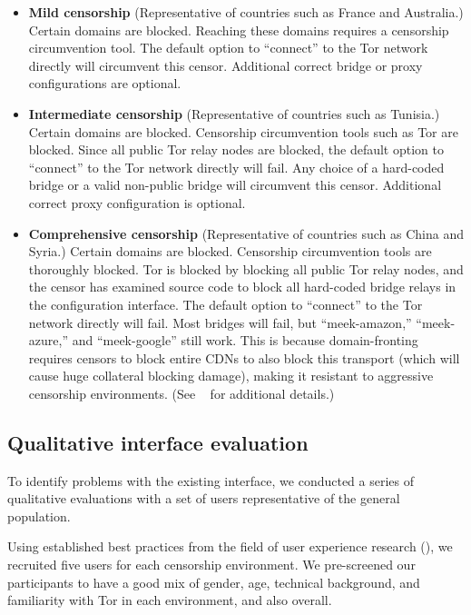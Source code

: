 \documentclass{template}
\begin{document}
\begin{itemize} \itemsep1pt \parskip0pt 
\item {\bfseries Mild censorship} 
(Representative of countries such as France and Australia.)
Certain domains are blocked. Reaching these 
domains requires a censorship circumvention 
tool. The default option to ``connect'' to the Tor network 
directly will circumvent this censor. Additional correct
bridge or proxy configurations are optional. 

\item {\bfseries Intermediate censorship} 
(Representative of countries such as Tunisia.)
Certain domains are blocked. Censorship circumvention
tools such as Tor are blocked. Since all public Tor
relay nodes are blocked, the default option to ``connect'' to the Tor network
directly will fail. Any choice of a hard-coded bridge
or a valid non-public bridge will circumvent this censor.  
Additional correct proxy configuration is optional.

\item {\bfseries Comprehensive censorship} 
(Representative of countries such as China and Syria.)
Certain domains are blocked. Censorship circumvention tools
are thoroughly blocked. Tor is blocked by blocking all public
Tor relay nodes, and the censor has examined source code to block
all hard-coded bridge relays in the configuration interface. The default option
to ``connect'' to the Tor network directly will fail. Most bridges will fail,
but ``meek-amazon,'' ``meek-azure,'' and ``meek-google'' still work.
This is because domain-fronting requires censors to block entire CDNs to also
block this transport (which will cause huge collateral blocking damage), making
it resistant to aggressive censorship environments.
(See ~\cite{fifield2015blocking} for additional details.)\\
\end{itemize}

\subsection{Qualitative interface evaluation}
To identify problems with the existing interface, we conducted a series of
qualitative evaluations with a set of users representative of the general
population.

Using established best practices from the field of user experience research
(\cite{howmanyusers}), we recruited five users for each censorship environment.
We pre-screened our participants to have a good mix of gender, age, technical
background, and familiarity with Tor in each environment, and also overall. \\
\end{document}
